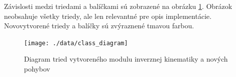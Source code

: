 Závislosti medzi triedami a balíčkami sú zobrazené na obrázku \ref{pic_class_diagram}. Obrázok neobsahuje všetky triedy, ale len relevantné pre opis implementácie. Novovytvorené triedy a balíčky sú zvýraznené tmavou farbou.

\begin{landscape}
\thispagestyle{empty}
\begin{figure}[H]
\centering
	\texttt{[image: ./data/class\_diagram]}
	\caption{Diagram tried vytvoreného modulu inverznej kinematiky a nových pohybov}
	\label{pic_class_diagram}
\end{figure}
\end{landscape}

